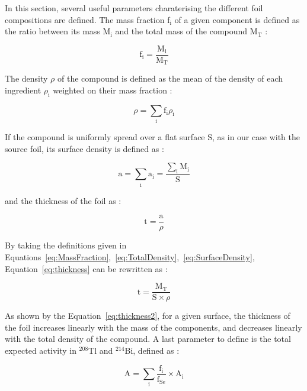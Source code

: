 \documentclass[main.tex]{subfiles}
\begin{document}
\NI In this section, several useful parameters charaterising the different foil compositions are defined. The mass fraction f$_\text{i}$ of a given component is defined as the ratio between its mass M$_\text{i}$ and the total mass of the compound M$_\text{T}$ :


\begin{equation}\label{eq:MassFraction}
\text{f}_\text{i} = \frac{\text{M}_\text{i}}{\text{M}_\text{T}}
\end{equation}


\NI The density $\rho$ of the compound is defined as the mean of the density of each ingredient $\rho_\text{i}$ weighted on their mass fraction :


\begin{equation}\label{eq:TotalDensity}
\rho = \sum_\text{i} \text{f}_\text{i} \rho_\text{i} 
\end{equation}


\NI If the compound is uniformly spread over a flat surface S, as in our case with the source foil, its surface density is defined as :


\begin{equation}\label{eq:SurfaceDensity}
\text{a} = \sum_\text{i} \text{a}_\text{i} = \frac{\sum_\text{i} \text{M}_\text{i}}{\text{S}}
\end{equation}

\NI and the thickness of the foil as :


\begin{equation}\label{eq:thickness}
\text{t} = \frac{\text{a}}{\rho}
\end{equation}


\NI By taking the definitions given in Equations~\ref{eq:MassFraction},~\ref{eq:TotalDensity},~\ref{eq:SurfaceDensity}, Equation~\ref{eq:thickness} can be rewritten as : 


\begin{equation}\label{eq:thickness2}
\text{t} = \frac{\text{M}_\text{T}}{\text{S} \times \rho}
\end{equation} 


\NI As shown by the Equation~\ref{eq:thickness2}, for a given surface, the thickness of the foil increases linearly with the mass of the components, and decreases linearly with the total density of the compound. A last parameter to define is the total expected activity in $^{\text{208}}$Tl and $^{\text{214}}$Bi, defined as : 


\begin{equation}\label{eq:ActivityComponent}
\text{A} = \sum_\text{i} \frac{\text{f}_\text{i}}{\text{f}_{\text{Se}}} \times \text{A}_\text{i}
\end{equation}
\end{document}
